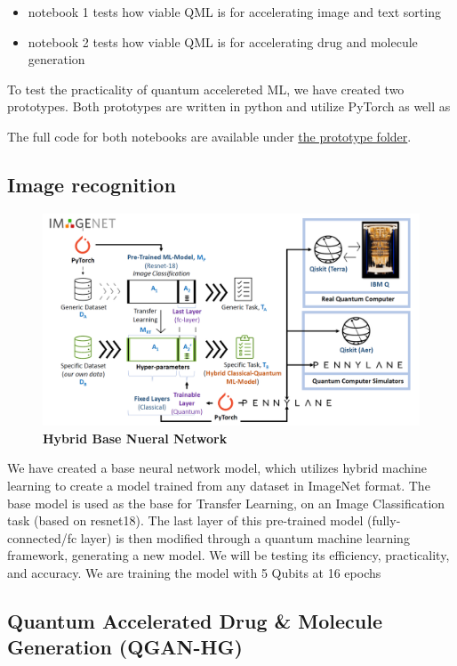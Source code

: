 \documentclass{scrartcl}
\begin{document}
\begin{itemize}
\item notebook 1 tests how viable QML is for accelerating image and text sorting
\item notebook 2 tests how viable QML is for accelerating drug and molecule generation
\end{itemize}

To test the practicality of quantum accelereted ML, we have created two prototypes. Both prototypes are written in python and utilize PyTorch as well as

The full code for both notebooks are available under \href{prototype/}{the prototype folder}.

\subsection{Image recognition}
\label{sec:org1cca114}

\begin{figure}[htbp]
\centering
\includegraphics[width=.9\linewidth]{./assets/imagenet.png}
\caption{\textbf{Hybrid Base Nueral Network}}
\end{figure}

We have created a base neural network model, which utilizes hybrid machine learning to create a model trained from any dataset in ImageNet format. The base model is used as the base for Transfer Learning, on an Image Classification task (based on resnet18). The last layer of this pre-trained model (fully-connected/fc layer) is then modified through a quantum machine learning framework, generating a new model. We will be testing its efficiency, practicality, and accuracy. We are training the model with 5 Qubits at 16 epochs

\subsection{Quantum Accelerated Drug \& Molecule Generation (QGAN-HG)}
\label{sec:orgd7dd426}
\end{document}

